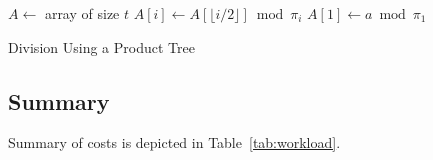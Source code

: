 \documentclass[11pt]{llncs}
\begin{document}
\begin{algorithm}
\newcommand{\vstart}{\ensuremath{\mathrm{start}}}
\newcommand{\vmid}{\ensuremath{\mathrm{mid}}}
\newcommand{\vend}{\ensuremath{\mathrm{end}}}
\begin{algorithmic}[1]
\State $A \gets $ array of size $t$
    \State $A[i] \gets A[\lfloor i/2 \rfloor] \bmod \pi_i$
    \State {}
    \State {}
  \EndIf
\EndFunction
\State $A[1] \gets a \bmod \pi_1$
\State {}
\State {}
\end{algorithmic}
\caption{Division Using a Product Tree}\label{alg:div-prod-tree}
\end{algorithm}


\subsection{Summary}

Summary of costs is depicted in Table~\ref{tab:workload}.
\end{document}
